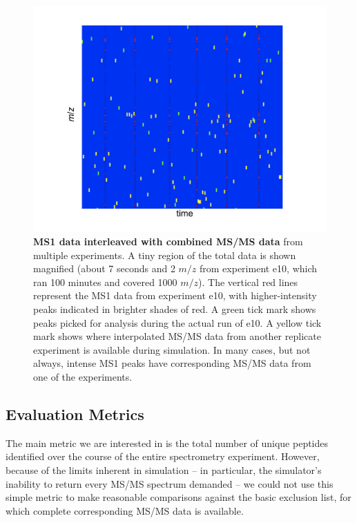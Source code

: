 \documentclass[12pt,twoside,openright]{report}
\begin{document}
\begin{figure}
\centering
\includegraphics[width=6.0in]{combinedmsms.pdf}
\caption[MS1 data interleaved with combined MS/MS data from multiple
  experiments]{{\bf MS1 data interleaved with combined MS/MS data} from multiple
  experiments. A tiny region of the total data is shown magnified (about 7
  seconds and 2 $m/z$ from experiment e10, which ran 100 minutes and covered
  1000 $m/z$). The vertical red lines represent the MS1 data from experiment
  e10, with higher-intensity peaks indicated in brighter shades of red. A green
  tick mark shows peaks picked for analysis during the actual run of e10. A
  yellow tick mark shows where interpolated MS/MS data from another replicate
  experiment is available during simulation. In many cases, but not always,
  intense MS1 peaks have corresponding MS/MS data from one of the experiments.
  \label{figure:combinedmsms}}
\end{figure}

\subsection{Evaluation Metrics} \label{subsection:evalmetric}

The main metric we are interested in is the total number of unique peptides
identified over the course of the entire spectrometry experiment. However,
because of the limits inherent in simulation -- in particular, the simulator's
inability to return every MS/MS spectrum demanded -- we could not use this
simple metric to make reasonable comparisons against the basic exclusion list,
for which complete corresponding MS/MS data is available.
\end{document}

